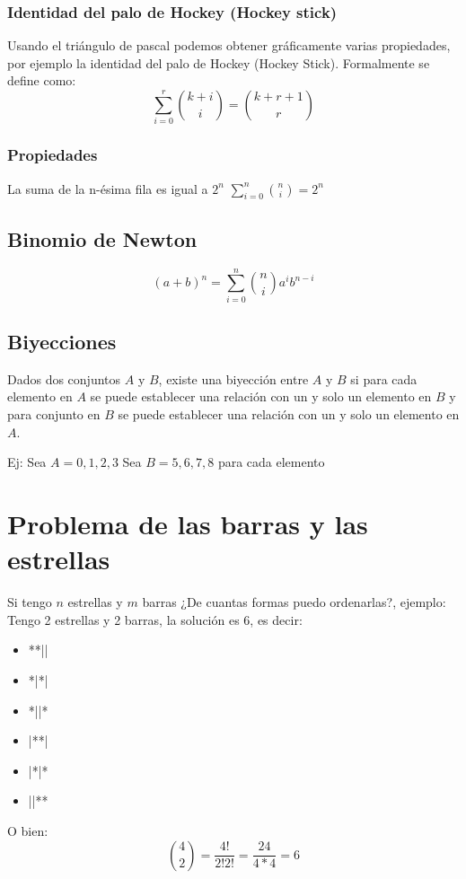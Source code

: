 \subsubsection{Identidad del palo de Hockey (Hockey stick)}
Usando el triángulo de pascal podemos obtener gráficamente varias propiedades, por ejemplo la identidad del palo de Hockey (Hockey Stick). Formalmente se define como:
\[
    \sum_{i = 0}^{r} { {k + i} \choose i } = { { k + r + 1 } \choose r }    
\]

\subsubsection{Propiedades}
La suma de la n-ésima fila es igual a $2^{n}$ \newline
$\sum_{i = 0}^{n} {n \choose i } = 2^{n} $ 

\subsection{Binomio de Newton}
\[
    (a + b)^{n} = \sum_{i = 0}^{n} {n \choose i} a^{i}b^{n - i}    
\]

\subsection{Biyecciones}
Dados dos conjuntos $A$ y $B$, existe una biyección entre $A$ y $B$ si para cada elemento en $A$ se puede establecer una relación con un y solo un elemento en $B$ y para conjunto en $B$ se puede establecer una relación con un y solo un elemento en $A$. \newline

Ej: \newline
Sea $A = {0, 1, 2, 3}$ \newline
Sea $B = {5, 6, 7, 8}$ \newline 
para cada elemento 

\section{Problema de las barras y las estrellas}
Si tengo $n$ estrellas y $m$ barras ¿De cuantas formas puedo ordenarlas?, ejemplo: \newline
Tengo 2 estrellas y 2 barras, la solución es 6, es decir:
\begin{itemize}
    \item **||
    \item *|*|
    \item *||*
    \item |**|
    \item |*|*
    \item ||**
\end{itemize}
O bien:
\[
    { 4 \choose 2 } = \frac{4!}{2! 2!} = \frac{24}{4 * 4} = 6    
\]

